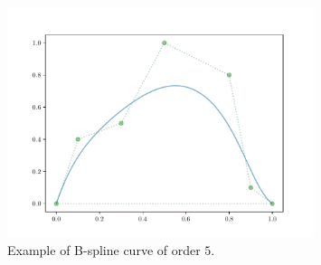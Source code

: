 \begin{figure}[t]
	\centering
	\includegraphics[width=0.8\textwidth]{Figs/AppendixA/bspline_example.pdf}
	\caption{Example of B-spline curve of order $5$.}%
    \label{FIG:BSPLINE-CURVE}
\end{figure}

